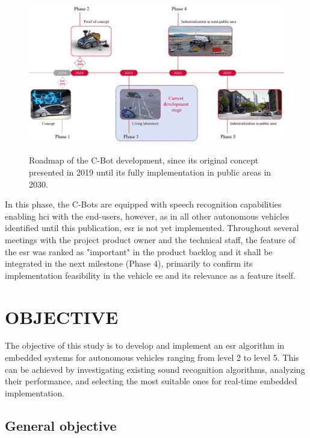 \begin{figure}[htbp]
    \raggedright
        \caption{Roadmap of the C-Bot development, since its original concept presented in 2019 until its fully implementation in public areas in 2030.}
        \includegraphics[width=1\textwidth]{resources/images/020-introduction/Introduction_context_C-Bot_roadmap.png}
        \label{fig:introduction_C-Bot_roadmap}
\end{figure} 

In this phase, the C-Bots are equipped with speech recognition capabilities enabling \gls{hci} with the end-users, however, as in all other autonomous vehicles identified until this publication, \gls{esr} is not yet implemented. Throughout several meetings with the project product owner and the technical staff, the feature of the \gls{esr} was ranked as "important" in the product backlog and it shall be integrated in the next milestone (Phase 4), primarily to confirm its implementation feasibility in the vehicle \gls{ee} and its relevance as a feature itself.


\section{OBJECTIVE}
\label{sec:introduction_objective}

The objective of this study is to develop and implement an \gls{esr} algorithm in embedded systems for autonomous vehicles ranging from level 2 to level 5. This can be achieved by investigating existing sound recognition algorithms, analyzing their performance, and selecting the most suitable ones for real-time embedded implementation.


\subsection{General objective}
\label{subsec:objectives_general}

